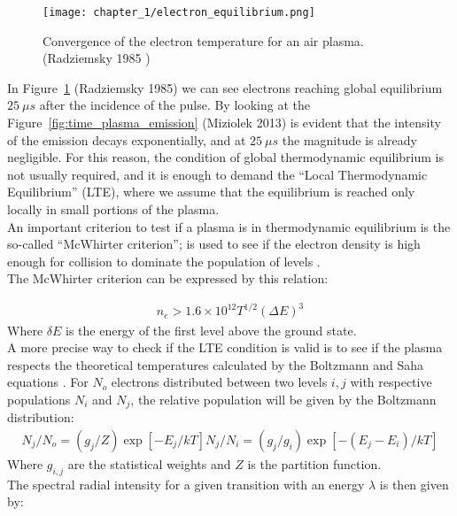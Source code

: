 \begin{figure}[H]
    \centering
    \texttt{[image: chapter\_1/electron\_equilibrium.png]}
    \caption{Convergence of the electron temperature for an air plasma. (Radziemsky 1985 \cite{radziemskiMeasurementPropertiesCO21985})}
    \label{fig:electron_equilibrium}
\end{figure}
In Figure~\ref{fig:electron_equilibrium} (Radziemsky 1985) we can see electrons reaching global equilibrium $25\:\mu s$ after the incidence of the pulse. By looking at the Figure~\ref{fig:time_plasma_emission} (Miziolek 2013) is evident that the intensity of the emission decays exponentially, and at $25\: \mu s$ the magnitude is already negligible. For this reason, the condition of global thermodynamic equilibrium is not usually required, and it is enough to demand the “Local Thermodynamic Equilibrium” (LTE), where we assume that the equilibrium is reached only locally in small portions of the plasma.
\\
An important criterion to test if a plasma is in thermodynamic equilibrium is the so-called “McWhirter criterion”; is used to see if the electron density is high enough for collision to dominate the population of levels \cite{ferrariPlasmaDiagnosticTechniques1967}. 
\\
The McWhirter criterion can be expressed by this relation: 

\begin{align}
   n_{e}>1.6\times{10}^{12}T^{1/2}\left(\Delta E\right)^3 \label{eq:mcwhirter_criterion}  
\end{align}
Where $\delta E$ is the energy of the first level above the ground state.
\\
A more precise way to check if the LTE condition is valid is to see if the plasma respects the theoretical temperatures calculated by the Boltzmann and Saha equations \cite{colaoLaserinducedBreakdownSpectroscopy2002} \cite{quinteroDeterminationExcitationTemperature1997}. 
For $N_o$ electrons distributed between two levels $i,j$ with respective populations $N_i$ and $N_j$, the relative population will be given by the Boltzmann distribution:
\begin{align}
   N_j/N_{o}=\left(g_j/Z\right)\exp{\left[-E_j/kT\right]}N_j/N_i=\left(g_j/g_i\right)\exp{\left[-\left(E_j-E_i\right)/kT\right]} \label{eq:boltzmann_distribution}  
\end{align}
Where $g_{i,j}$ are the statistical weights and $Z$ is the partition function.
\\
The spectral radial intensity for a given transition with an energy $\lambda$ is then given by: 

